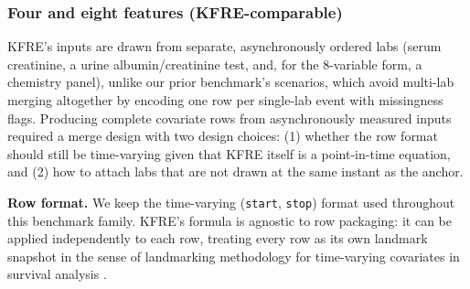 \subsubsection{Four and eight features (KFRE-comparable)}
KFRE's inputs are drawn from separate, asynchronously ordered labs (serum creatinine, a urine albumin/creatinine test, and, for the 8-variable form, a chemistry panel), unlike our prior benchmark's scenarios, which avoid multi-lab merging altogether by encoding one row per single-lab event with missingness flags. Producing complete covariate rows from asynchronously measured inputs required a merge design with two design choices: (1) whether the row format should still be time-varying given that KFRE itself is a point-in-time equation, and (2) how to attach labs that are not drawn at the same instant as the anchor.

\textbf{Row format.} We keep the time-varying (\texttt{start}, \texttt{stop}) format used throughout this benchmark family. KFRE's formula is agnostic to row packaging: it can be applied independently to each row, treating every row as its own landmark snapshot in the sense of landmarking methodology for time-varying covariates in survival analysis \citep{vanhouwelingen2007landmarking,putter2022landmarking2}.

